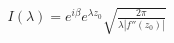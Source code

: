 \documentclass[preview]{standalone}
\begin{document}
\begin{align*}
I(\lambda) = e^{i\beta} e^{\lambda z_0} \sqrt{\frac{2\pi}{\lambda |f''(z_0)|}}
\end{align*}
\end{document}
